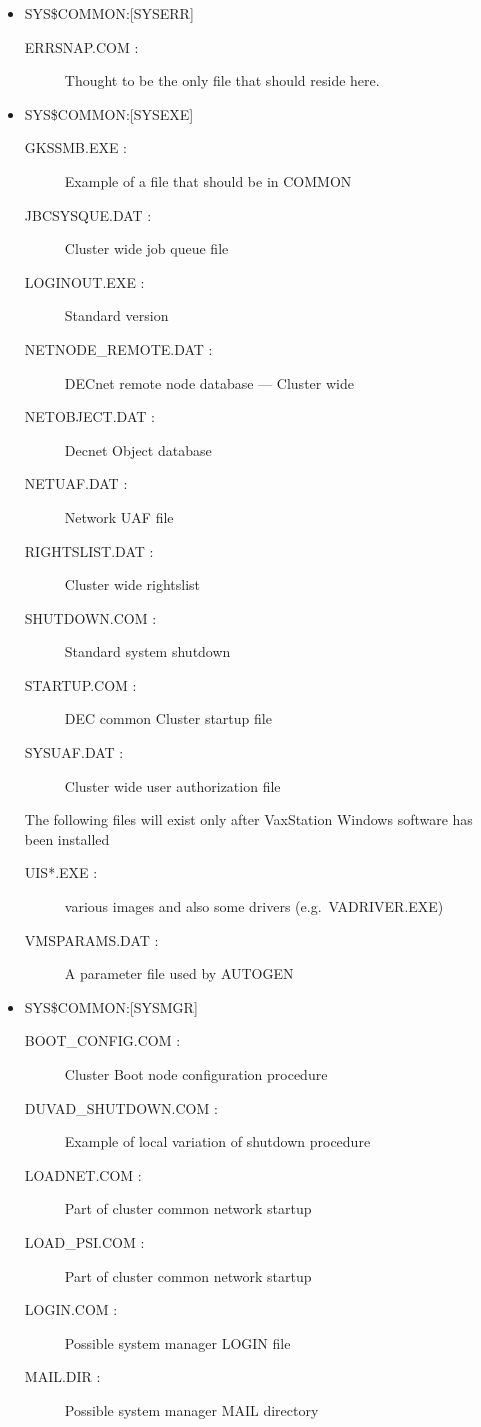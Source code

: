 \begin{itemize}
\item {SYS\$COMMON:[SYSERR]}
\begin{description}
\item [ERRSNAP.COM : ] Thought to be the only file that should reside here.
\end{description}
\item {SYS\$COMMON:[SYSEXE]}
\begin{description}
\item [GKSSMB.EXE : ] Example of a file that should be in COMMON
\item [JBCSYSQUE.DAT : ] Cluster wide job queue file
\item [LOGINOUT.EXE : ] Standard version
\item [NETNODE\_REMOTE.DAT : ] DECnet remote node database --- Cluster wide
\item [NETOBJECT.DAT : ] Decnet Object database
\item [NETUAF.DAT : ] Network UAF file
\item [RIGHTSLIST.DAT : ] Cluster wide rightslist
\item [SHUTDOWN.COM : ] Standard system shutdown
\item [STARTUP.COM : ] DEC common Cluster startup file
\item [SYSUAF.DAT : ] Cluster wide user authorization file
\end{description}
The following files will exist only after VaxStation Windows software has been
installed
\begin{description}
\item [UIS*.EXE : ] various images and also some drivers (e.g.\ VADRIVER.EXE)
\item [VMSPARAMS.DAT : ] A parameter file used by AUTOGEN
\end{description}
\item {SYS\$COMMON:[SYSMGR]}
\begin{description}
\item [BOOT\_CONFIG.COM : ] Cluster Boot node configuration procedure
\item [DUVAD\_SHUTDOWN.COM : ] Example of local variation of shutdown procedure
\item [LOADNET.COM : ] Part of cluster common network startup
\item [LOAD\_PSI.COM : ] Part of cluster common network startup
\item [LOGIN.COM : ] Possible system manager LOGIN file
\item [MAIL.DIR : ] Possible system manager MAIL directory

\end{description}
\end{itemize}
